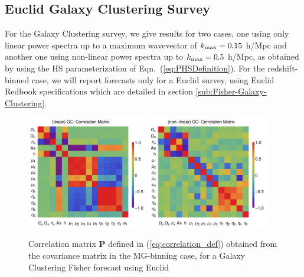\subsection{\label{sub:GC-Correlations}Euclid Galaxy Clustering Survey}


For the Galaxy Clustering survey, we give results for two cases, one
using only linear power spectra up to a maximum wavevector of $k_{\rm max}=0.15$
h/Mpc and another one using non-linear power spectra up to $k_{\rm max}=0.5$
h/Mpc, as obtained by using the HS parameterization of
Eqn.\ (\ref{eq:PHSDefinition}).
For the redshift-binned case, we will report forecasts only for a Euclid survey, 
using Euclid Redbook specifications which
are detailed in section \ref{sub:Fisher-Galaxy-Clustering}.

\begin{figure}[htbp]
\centering
\includegraphics[width=0.47\textwidth]{Chapters/linear-nonlinear-MG-forecasts/figures/Decorrelations-GC/correlation-full-fiducialMGBin3-Euclid-GC-linearPK-}
\includegraphics[width=0.47\textwidth]{Chapters/linear-nonlinear-MG-forecasts/figures/Decorrelations-GC/correlation-full-fiducialMGBin3-Euclid-GC-nonlinearPk__Zhao-}
\caption[Correlation matrices for a Euclid Galaxy Clustering forecast.]{\label{fig:GCcorr}
Correlation matrix $\mathbf P$ defined in (\ref{eq:correlation_def}) obtained from the covariance matrix in the MG-binning case, for a Galaxy Clustering Fisher forecast using Euclid
}
\end{figure}
